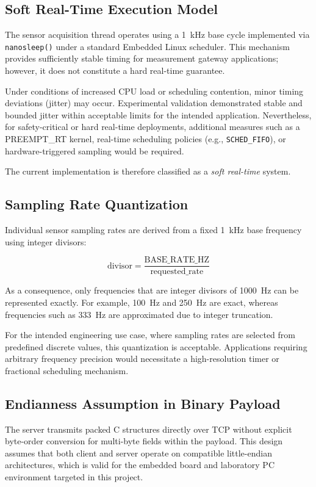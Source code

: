 \subsection{Soft Real-Time Execution Model}

The sensor acquisition thread operates using a 1~kHz base cycle implemented via \texttt{nanosleep()} under a standard Embedded Linux scheduler. This mechanism provides sufficiently stable timing for measurement gateway applications; however, it does not constitute a hard real-time guarantee.

Under conditions of increased CPU load or scheduling contention, minor timing deviations (jitter) may occur. Experimental validation demonstrated stable and bounded jitter within acceptable limits for the intended application. Nevertheless, for safety-critical or hard real-time deployments, additional measures such as a PREEMPT\_RT kernel, real-time scheduling policies (e.g., \texttt{SCHED\_FIFO}), or hardware-triggered sampling would be required.

The current implementation is therefore classified as a \emph{soft real-time} system.

\subsection{Sampling Rate Quantization}

Individual sensor sampling rates are derived from a fixed 1~kHz base frequency using integer divisors:

\[
\text{divisor} = \frac{\text{BASE\_RATE\_HZ}}{\text{requested\_rate}}
\]

As a consequence, only frequencies that are integer divisors of 1000~Hz can be represented exactly. For example, 100~Hz and 250~Hz are exact, whereas frequencies such as 333~Hz are approximated due to integer truncation.

For the intended engineering use case, where sampling rates are selected from predefined discrete values, this quantization is acceptable. Applications requiring arbitrary frequency precision would necessitate a high-resolution timer or fractional scheduling mechanism.

\subsection{Endianness Assumption in Binary Payload}

The server transmits packed C structures directly over TCP without explicit byte-order conversion for multi-byte fields within the payload. This design assumes that both client and server operate on compatible little-endian architectures, which is valid for the embedded board and laboratory PC environment targeted in this project.

